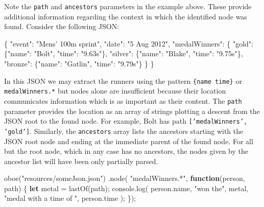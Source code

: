 \documentclass[12pt, ]{article}
\newenvironment{Shaded}{}{}
\newcommand{\KeywordTok}[1]{\textcolor[rgb]{0.00,0.44,0.13}{\textbf{{#1}}}}
\newcommand{\StringTok}[1]{\textcolor[rgb]{0.25,0.44,0.63}{{#1}}}
\newcommand{\OtherTok}[1]{\textcolor[rgb]{0.00,0.44,0.13}{{#1}}}
\newcommand{\FunctionTok}[1]{\textcolor[rgb]{0.02,0.16,0.49}{{#1}}}
\newcommand{\NormalTok}[1]{{#1}}
\begin{document}
Note the \texttt{path} and \texttt{ancestors} parameters in the example
above. These provide additional information regarding the context in
which the identified node was found. Consider the following JSON:

\begin{Shaded}
\begin{Highlighting}[]
\NormalTok{\{ }
   \StringTok{"event"}\NormalTok{: }\StringTok{"Mens' 100m sprint"}\NormalTok{,}
   \StringTok{"date"}\NormalTok{: }\StringTok{"5 Aug 2012"}\NormalTok{,}
   \StringTok{"medalWinners"}\NormalTok{: \{}
      \StringTok{"gold"}\NormalTok{:     \{}\StringTok{"name"}\NormalTok{: }\StringTok{"Bolt"}\NormalTok{,    }\StringTok{"time"}\NormalTok{: }\StringTok{"9.63s"}\NormalTok{\},}
      \StringTok{"silver"}\NormalTok{:   \{}\StringTok{"name"}\NormalTok{: }\StringTok{"Blake"}\NormalTok{,   }\StringTok{"time"}\NormalTok{: }\StringTok{"9.75s"}\NormalTok{\},}
      \StringTok{"bronze"}\NormalTok{:   \{}\StringTok{"name"}\NormalTok{: }\StringTok{"Gatlin"}\NormalTok{,  }\StringTok{"time"}\NormalTok{: }\StringTok{"9.79s"}\NormalTok{\}}
   \NormalTok{\}}
\NormalTok{\}  }
\end{Highlighting}
\end{Shaded}

In this JSON we may extract the runners using the pattern
\texttt{\{name time\}} or \texttt{medalWinners.*} but nodes alone are
insufficient because their location communicates information which is as
important as their content. The \texttt{path} parameter provides the
location as an array of strings plotting a descent from the JSON root to
the found node. For example, Bolt has path
\texttt{{[}'medalWinners', 'gold'{]}}. Similarly, the \texttt{ancestors}
array lists the ancestors starting with the JSON root node and ending at
the immediate parent of the found node. For all but the root node, which
in any case has no ancestors, the nodes given by the ancestor list will
have been only partially parsed.

\begin{Shaded}
\begin{Highlighting}[]
\FunctionTok{oboe}\NormalTok{(}\StringTok{"resources/someJson.json"}\NormalTok{)}
   \NormalTok{.}\FunctionTok{node}\NormalTok{( }\StringTok{"medalWinners.*"}\NormalTok{, }\KeywordTok{function}\NormalTok{(person, path) \{}
      \KeywordTok{let} \NormalTok{metal = }\FunctionTok{lastOf}\NormalTok{(path);}
      \OtherTok{console}\NormalTok{.}\FunctionTok{log}\NormalTok{( }\OtherTok{person}\NormalTok{.}\FunctionTok{name}\NormalTok{, }\StringTok{"won the"}\NormalTok{, metal, }
        \StringTok{"medal with a time of "}\NormalTok{, }\OtherTok{person}\NormalTok{.}\FunctionTok{time} \NormalTok{);}
   \NormalTok{\});}
\end{Highlighting}
\end{Shaded}
\end{document}
